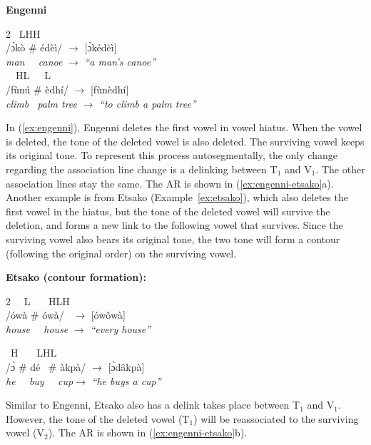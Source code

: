 \ex \textbf{Engenni} \label{ex:engenni}
\begin{multicols}{2}
\quad\ L\quad H\qquad\qquad H\\
	/\` ɔkò \# édèì/ $\rightarrow$ [\` ɔkédèì] \\
	\textit{man \ \ canoe} $\rightarrow$ \textit{``a man’s canoe''} \\
	
	\quad\ \ H\quad L\qquad\qquad\ \ \ L\\
	/fùnú \# èdhí/ $\rightarrow$ [fùnèdhí] \\
	\textit{climb \ palm tree} $\rightarrow$ \textit{``to climb a palm tree''}
\end{multicols}
\xe

In (\ref{ex:engenni}), Engenni deletes the first vowel in vowel hiatus.
When the vowel is deleted, the tone of the deleted vowel is also
deleted. The surviving vowel keeps its original tone. To represent this
process autosegmentally, the only change regarding the association line
change is a delinking between T$_1$ and V$_1$. The other association
lines stay the same. The AR is shown in (\ref{ex:engenni-etsako}a).
Another example is from Etsako (Example~\ref{ex:etsako}), which also
deletes the first vowel in the hiatus, but the tone of the deleted vowel
will survive the deletion, and forms a new link to the following vowel
that survives. Since the surviving vowel also bears its original tone,
the two tone will form a contour (following the original order) on the
surviving vowel.

\ex \textbf{Etsako (contour formation):}
\label{ex:etsako}
\vspace{-1em}
\begin{multicols}{2}
	\quad\ \ L \ \ \ H\qquad\qquad LH\\
	/ówà \# ówà/ \ $\rightarrow$ [ówǒwà] \\
	\textit{house \ \ house} $\rightarrow$ \textit{``every house''}
	
	\qquad\ H \ \ \ L\qquad\qquad HL\\
	/\`ɔ \# dé \ \# àkpà/ $\rightarrow$ [\`ɔdâkpà] \\
	\textit{he \ \ buy \ \ cup}\quad$\rightarrow$ \textit{``he buys a cup''}
\end{multicols}
\xe

Similar to Engenni, Etsako also has a delink takes place between T$_1$
and V$_1$. However, the tone of the deleted vowel (T$_1$) will be
reassociated to the surviving vowel (V$_2$). The AR is shown in
(\ref{ex:engenni-etsako}b).

